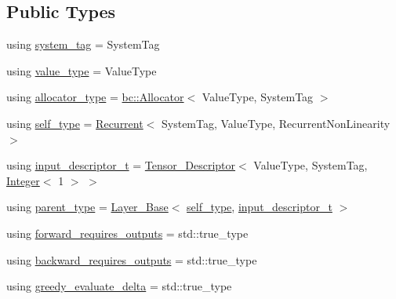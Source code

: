 \subsection*{Public Types}
\begin{DoxyCompactItemize}
\item 
using \hyperlink{structbc_1_1nn_1_1Recurrent_a4342e7f5393c7fa645eb4f314a762906}{system\+\_\+tag} = System\+Tag
\item 
using \hyperlink{structbc_1_1nn_1_1Recurrent_a63e637ac6714329732170ad23e7b1b67}{value\+\_\+type} = Value\+Type
\item 
using \hyperlink{structbc_1_1nn_1_1Recurrent_ad327a3345cf6cc3199f0e5670a3d058d}{allocator\+\_\+type} = \hyperlink{classbc_1_1allocators_1_1Allocator}{bc\+::\+Allocator}$<$ Value\+Type, System\+Tag $>$
\item 
using \hyperlink{structbc_1_1nn_1_1Recurrent_ab049bf64fd16f982e5b52b185669488d}{self\+\_\+type} = \hyperlink{structbc_1_1nn_1_1Recurrent}{Recurrent}$<$ System\+Tag, Value\+Type, Recurrent\+Non\+Linearity $>$
\item 
using \hyperlink{structbc_1_1nn_1_1Recurrent_a5b3abbc190059309b64aff068cc38f6a}{input\+\_\+descriptor\+\_\+t} = \hyperlink{structbc_1_1nn_1_1Tensor__Descriptor}{Tensor\+\_\+\+Descriptor}$<$ Value\+Type, System\+Tag, \hyperlink{structbc_1_1traits_1_1Integer}{Integer}$<$ 1 $>$ $>$
\item 
using \hyperlink{structbc_1_1nn_1_1Recurrent_a8c8966c1c72d6a30be5b89408b78b105}{parent\+\_\+type} = \hyperlink{structbc_1_1nn_1_1Layer__Base}{Layer\+\_\+\+Base}$<$ \hyperlink{structbc_1_1nn_1_1Recurrent_ab049bf64fd16f982e5b52b185669488d}{self\+\_\+type}, \hyperlink{structbc_1_1nn_1_1Recurrent_a5b3abbc190059309b64aff068cc38f6a}{input\+\_\+descriptor\+\_\+t} $>$
\item 
using \hyperlink{structbc_1_1nn_1_1Recurrent_a5d8408035c0c266c1f2b0f4172f7d842}{forward\+\_\+requires\+\_\+outputs} = std\+::true\+\_\+type
\item 
using \hyperlink{structbc_1_1nn_1_1Recurrent_a3697ec607c320d6e7719764a299d8a54}{backward\+\_\+requires\+\_\+outputs} = std\+::true\+\_\+type
\item 
using \hyperlink{structbc_1_1nn_1_1Recurrent_ab97457c29f8666ce83b9ea94b0ad1053}{greedy\+\_\+evaluate\+\_\+delta} = std\+::true\+\_\+type
\end{DoxyCompactItemize}
